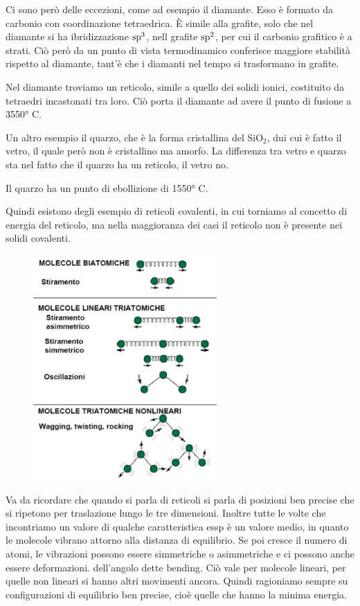 Ci sono però delle eccezioni, come ad esempio il diamante. Esso è formato da carbonio con coordinazione tetraedrica. È simile alla grafite, solo che nel diamante si ha ibridizzazione $\rm sp^3$, nell grafite $\rm sp^2$, per cui il carbonio grafitico è a strati. Ciò però da un punto di vista termodinamico conferisce maggiore stabilità rispetto al diamante, tant'è che i diamanti nel tempo si trasformano in grafite.

Nel diamante troviamo un reticolo, simile a quello dei solidi ionici, costituito da tetraedri incastonati tra loro. Ciò porta il diamante ad avere il punto di fusione a 3550° C.

\vspace{0.2cm} Un altro esempio il quarzo, che è la forma cristallina del SiO$_2$, dui cui è fatto il vetro, il quale però non è cristallino ma amorfo. La differenza tra vetro e quarzo sta nel fatto che il quarzo ha un reticolo, il vetro no.

Il quarzo ha un punto di ebollizione di 1550° C.

Quindi esistono degli esempio di reticoli covalenti, in cui torniamo al concetto di energia del reticolo, ma nella maggioranza dei casi il reticolo non è presente nei solidi covalenti.

\hspace{0.7cm}\begin{minipage}{0.5 \textwidth}
    \begin{figure}[H]
        \includegraphics[width=7cm]{immagini/vibrazioni.png}
    \end{figure}
\end{minipage}
\begin{minipage}{0.4 \textwidth}
\vspace{-0.4cm}Va da ricordare che quando si parla di reticoli si parla di posizioni ben precise che si ripetono per traslazione lungo le tre dimensioni. Inoltre tutte le volte che incontriamo un valore di qualche caratteristica essp è un valore medio, in quanto le molecole vibrano attorno alla distanza di equilibrio. Se poi cresce il numero di atomi, le vibrazioni possono essere simmetriche o asimmetriche e ci possono anche essere deformazioni. dell'angolo dette bending. Ciò vale per molecole lineari, per quelle non lineari si hanno altri movimenti ancora. Quindi ragioniamo sempre su configurazioni di equilibrio ben precise, cioè quelle che hanno la minima energia.
\end{minipage}
